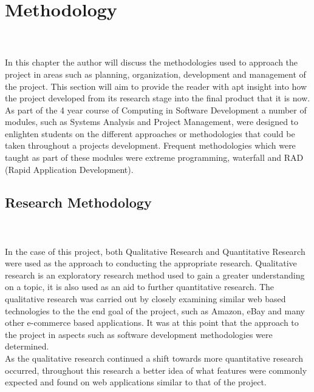 \chapter{Methodology} \\ \\
In this chapter the author will discuss the methodologies used to approach the project in areas such as planning, organization, development and management of the project. This section will aim to provide the reader with apt insight into how the project developed from its research stage into the final product that it is now. \\
As part of the 4 year course of Computing in Software Development a number of modules, such as Systems Analysis and Project Management, were designed to enlighten students on the different approaches or methodologies that could be taken throughout a projects development. Frequent methodologies which were taught as part of these modules were extreme programming, waterfall and RAD (Rapid Application Development). 

\section{Research Methodology} \\ \\
In the case of this project, both Qualitative Research and Quantitative 
Research were used as the approach to conducting the appropriate research. Qualitative research is an exploratory research method used to gain a greater understanding on a topic, it is also used as an aid to further quantitative research. The qualitative research was carried out by closely examining similar web based technologies to the the end goal of the project, such as Amazon, eBay and many other e-commerce based applications. It was at this point that the approach to the project in aspects such as software development methodologies were determined. \\
As the qualitative research continued a shift towards more quantitative research occurred, throughout this research a better idea of what features were commonly expected and found on web applications similar to that of the project. \\ \\

